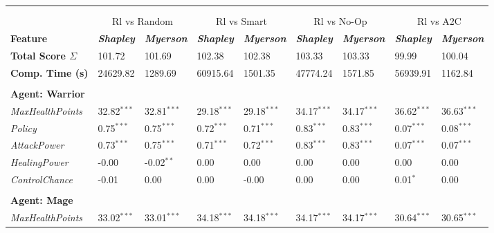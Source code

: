 \begin{tabular}{lllllllll}
&                           & & & & &                          & &\\
&                           & & & & &                          & &\\
&\multicolumn{2}{c}{Rl vs Random}&\multicolumn{2}{c}{Rl vs Smart}&\multicolumn{2}{c}{Rl vs No-Op}&\multicolumn{2}{c}{Rl vs A2C}\\
\textbf{Feature}         & \textit{\textbf{Shapley}} & \textit{\textbf{Myerson}}& \textit{\textbf{Shapley}} & \textit{\textbf{Myerson}}& \textit{\textbf{Shapley}} & \textit{\textbf{Myerson}}& \textit{\textbf{Shapley}} & \textit{\textbf{Myerson}} \\
\textbf{Total Score $\Sigma$} & 101.72&101.69&102.38&102.38&103.33&103.33&99.99&100.04 \\\n\textbf{Comp. Time (s)} & 24629.82&1289.69&60915.64&1501.35&47774.24&1571.85&56939.91&1162.84 \\\n\hline
&                           & & & & &                          & &\\
\textbf{Agent: Warrior }        &                           &                           & &\\
\textit{MaxHealthPoints} & 32.82${}^{***}$                   & 32.81${}^{***}$ & 29.18${}^{***}$ &  29.18${}^{***}$ & 34.17${}^{***}$  & 34.17${}^{***}$ & 36.62${}^{***}$  & 36.63${}^{***}$                \\
\textit{Policy}     & 0.75${}^{***}$                    & 0.75${}^{***}$      & 0.72${}^{***}$ &   0.71${}^{***}$ & 0.83${}^{***}$ & 0.83${}^{***}$ & 0.07${}^{***}$  & 0.08${}^{***}$         \\
\textit{AttackPower}     & 0.73${}^{***}$                    & 0.75${}^{***}$      & 0.71${}^{***}$ &   0.72${}^{***}$ & 0.83${}^{***}$ & 0.83${}^{***}$ & 0.07${}^{***}$  & 0.07${}^{***}$         \\
\textit{HealingPower}    & -0.00                   & -0.02${}^{**}$     & 0.00  & 0.00 & 0.00 & 0.00 & 0.00  & 0.00        \\
\textit{ControlChance}   & -0.01                   & 0.00    & 0.00    & -0.00 & 0.00   & 0.00 & 0.01${}^{*}$  & 0.00        \\
&                           & & & & &                          & &\\
\textbf{Agent: Mage }        &                           &                           & &\\
\textit{MaxHealthPoints} & 33.02${}^{***}$                   & 33.01${}^{***}$ & 34.18${}^{***}$ &  34.18${}^{***}$ & 34.17${}^{***}$  & 34.17${}^{***}$ & 30.64${}^{***}$  & 30.65${}^{***}$                \\

\end{tabular}
